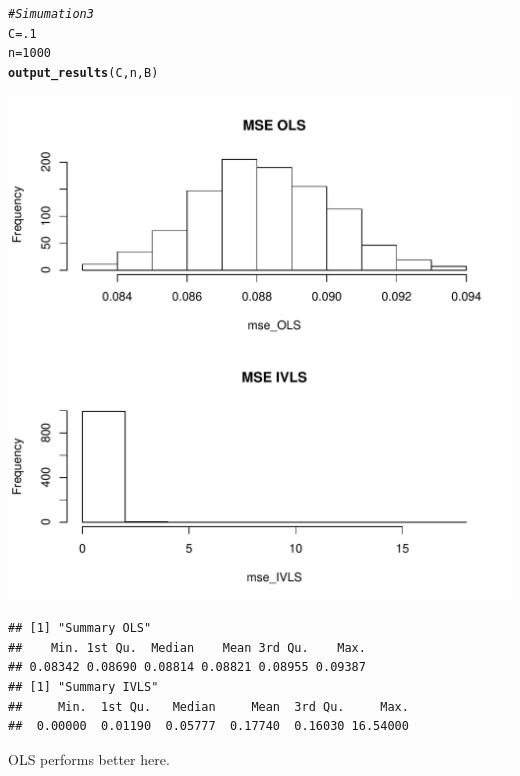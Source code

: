 \documentclass[11pt]{article}\usepackage[]{graphicx}\usepackage[]{color}
\makeatletter
\def\maxwidth{ %
  \ifdim\Gin@nat@width>\linewidth
    \linewidth
  \else
    \Gin@nat@width
  \fi
}
\newcommand{\hlnum}[1]{\textcolor[rgb]{0.686,0.059,0.569}{#1}}%
\newcommand{\hlcom}[1]{\textcolor[rgb]{0.678,0.584,0.686}{\textit{#1}}}%
\newcommand{\hlstd}[1]{\textcolor[rgb]{0.345,0.345,0.345}{#1}}%
\newcommand{\hlkwb}[1]{\textcolor[rgb]{0.69,0.353,0.396}{#1}}%
\newcommand{\hlkwd}[1]{\textcolor[rgb]{0.737,0.353,0.396}{\textbf{#1}}}%
\newenvironment{kframe}{%
 \def\at@end@of@kframe{}%
 \ifinner\ifhmode%
  \def\at@end@of@kframe{\end{minipage}}%
  \begin{minipage}{\columnwidth}%
 \fi\fi%
 \def\FrameCommand##1{\hskip\@totalleftmargin \hskip-\fboxsep
 \colorbox{shadecolor}{##1}\hskip-\fboxsep
     \hskip-\linewidth \hskip-\@totalleftmargin \hskip\columnwidth}%
 \MakeFramed {\advance\hsize-\width
   \@totalleftmargin\z@ \linewidth\hsize
   \@setminipage}}%
 {\par\unskip\endMakeFramed%
 \at@end@of@kframe}
\newenvironment{knitrout}{}{} %
\makeatother
\begin{document}
\begin{knitrout}
\color{fgcolor}\begin{kframe}
\begin{alltt}
\hlcom{# Simumation 3}
\hlstd{C}\hlkwb{=}\hlnum{.1}
\hlstd{n}\hlkwb{=}\hlnum{1000}
\hlkwd{output_results}\hlstd{(C,n,B)}
\end{alltt}
\end{kframe}
\includegraphics[width=\maxwidth]{figure/unnamed-chunk-6-1} 
\begin{kframe}\begin{lstlisting}[basicstyle=\ttfamily,breaklines=true]
## [1] "Summary OLS"
##    Min. 1st Qu.  Median    Mean 3rd Qu.    Max. 
## 0.08342 0.08690 0.08814 0.08821 0.08955 0.09387 
## [1] "Summary IVLS"
##     Min.  1st Qu.   Median     Mean  3rd Qu.     Max. 
##  0.00000  0.01190  0.05777  0.17740  0.16030 16.54000
\end{lstlisting}
\end{kframe}
\end{knitrout}
OLS performs better here.
\end{document}
